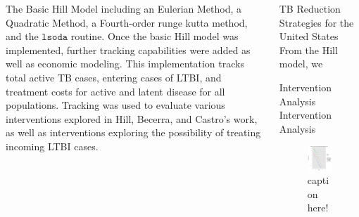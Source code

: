 \documentclass[final]{beamer}
\begin{document}
\begin{frame}
\begin{columns}
\begin{column}{.3\textwidth}
\begin{block}{The Basic Hill Model}
        including an Eulerian Method, a Quadratic Method, a Fourth-order runge
        kutta method, and the $\texttt{lsoda}$ routine. Once the basic Hill
        model was implemented, further tracking capabilities were added as well
        as economic modeling. This implementation tracks total active TB cases,
        entering cases of LTBI, and treatment costs for active and latent disease
        for all populations. Tracking was used to evaluate various interventions
        explored in Hill, Becerra, and Castro's work, as well as interventions
        exploring the possibility of treating incoming LTBI cases.
      \end{block}
    \end{column}
    \begin{column}{.3\textwidth}
      \begin{block}{TB Reduction Strategies for the United States}
        From the Hill model, we 
      \end{block}
      \begin{block}{Intervention Analysis}
        Intervention Analysis
        \begin{figure}[h]
          \begin{center}
            \includegraphics[scale=1]{incidencePlotRedEnLTBI.pdf}
          \end{center}
          \caption{caption here!}

\end{figure}
\end{block}
\end{column}
\end{columns}
\end{frame}
\end{document}
